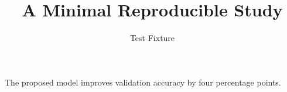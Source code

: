 \documentclass{article}
\title{A Minimal Reproducible Study}
\author{Test Fixture}
\begin{document}
\maketitle
The proposed model improves validation accuracy by four percentage points.


\end{document}

